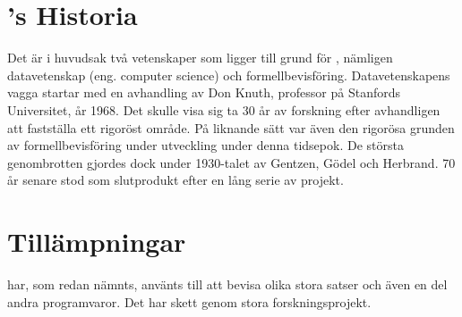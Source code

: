 \section{\coq's Historia}
Det är i huvudsak två vetenskaper som ligger till grund för \coq, nämligen
datavetenskap (eng. computer science) och formellbevisföring. Datavetenskapens
vagga startar med en avhandling av Don Knuth, professor på Stanfords
Universitet, år 1968. Det skulle visa sig ta 30 år av forskning efter
avhandligen att fastställa ett rigoröst område. På liknande sätt var även den
rigorösa grunden av formellbevisföring under utveckling under denna tidsepok.
De största genombrotten gjordes dock under 1930-talet av Gentzen, Gödel och
Herbrand. 70 år senare stod \coq som slutprodukt efter en lång serie av projekt.

\section{Tillämpningar}
\coq har, som redan nämnts, använts till att bevisa olika stora satser och även
en del andra programvaror. Det har skett genom stora forskningsprojekt.

